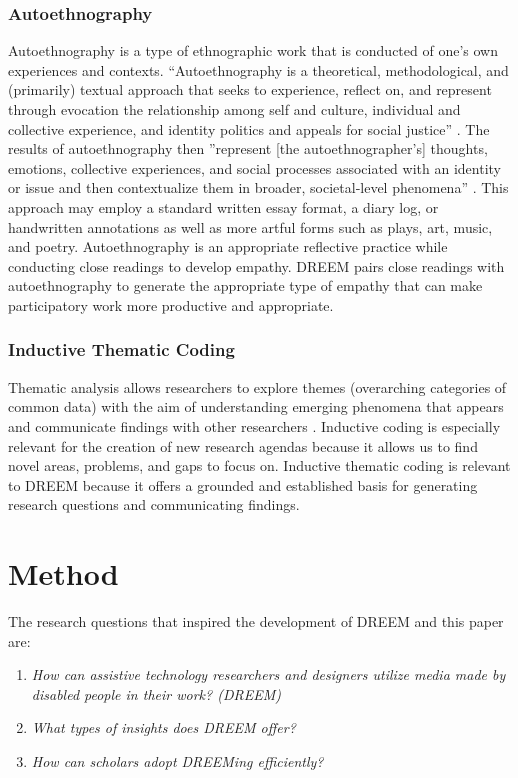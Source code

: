 \subsubsection{Autoethnography}
Autoethnography is a type of ethnographic work that is conducted of one's own experiences and contexts. ``Autoethnography is a theoretical, methodological, and (primarily) textual approach that seeks to experience, reflect on, and represent through evocation the relationship among self and culture, individual and collective experience, and identity politics and appeals for social justice'' \cite{holmanjonesAutoethnography2007}. The results of autoethnography then ''represent [the autoethnographer's] thoughts, emotions, collective experiences, and social processes associated with an identity or issue and then contextualize them in broader, societal‐level phenomena'' \cite{ramboAutoethnography2020}. This approach may employ a standard written essay format, a diary log, or handwritten annotations as well as more artful forms such as plays, art, music, and poetry. Autoethnography is an appropriate reflective practice while conducting close readings to develop empathy. DREEM pairs close readings with autoethnography to generate the appropriate type of empathy that can make participatory work more productive and appropriate.

\subsubsection{Inductive Thematic Coding}
Thematic analysis allows researchers to explore themes (overarching categories of common data) with the aim of  understanding emerging phenomena that appears and communicate findings with other researchers \cite{guestAppliedThematicAnalysis2012}. Inductive coding is especially relevant for the creation of new research agendas because it allows us to find novel areas, problems, and gaps to focus on. Inductive thematic coding is relevant to DREEM because it offers a grounded and established basis for generating research questions and communicating findings.

\section{Method}
The research questions that inspired the development of DREEM and this paper are: 
\begin{enumerate}[label=RQ\arabic*:]
\item \textit{How can assistive technology researchers and designers utilize media made by disabled people in their work? (DREEM)}
\item \textit{What types of insights does DREEM offer?} %
\item \textit{How can scholars adopt DREEMing efficiently?}
\end{enumerate}

